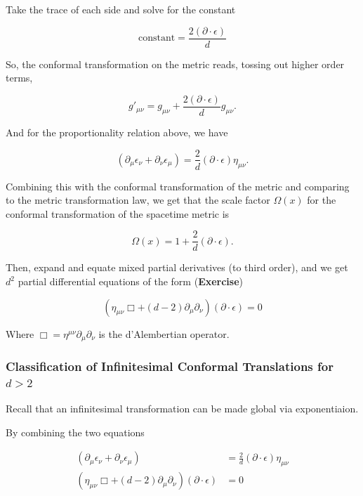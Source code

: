 \noindent Take the trace of each side and solve for the constant

\begin{equation}
\text{constant} = \frac{2 (\partial \cdot \epsilon)}{d}
\end{equation}

\noindent So, the conformal transformation on the metric reads, tossing out higher order terms,

\begin{equation}
g'_{\mu\nu} = g_{\mu\nu} + \frac{2 (\partial \cdot \epsilon)}{d} g_{\mu\nu}.
\end{equation}

\noindent And for the proportionality relation above, we have

\begin{equation}
(\partial_\mu \epsilon_\nu + \partial_\nu \epsilon_\mu) = \frac{2}{d} (\partial \cdot \epsilon) \eta_{\mu\nu}.
\end{equation}

\noindent Combining this with the conformal transformation of the metric and comparing to the metric transformation law, we get that the scale factor $\Omega(x)$ for the conformal transformation of the spacetime metric is 

\begin{equation}
\Omega(x) = 1+\frac{2}{d} (\partial \cdot \epsilon).
\end{equation}

\noindent Then, expand and equate mixed partial derivatives (to third order), and we get $d^2$ partial differential equations of the form (\textbf{Exercise})

\begin{equation}
(\eta_{\mu\nu} \Box + (d-2) \partial_\mu \partial_\nu) (\partial \cdot \epsilon) = 0
\end{equation}

\noindent Where $\Box = \eta^{\mu\nu} \partial_\mu \partial_\nu$ is the d'Alembertian operator.

\subsubsection*{Classification of Infinitesimal Conformal Translations for $d>2$}

\noindent Recall that an infinitesimal transformation can be made global via exponentiaion.

\noindent By combining the two equations

\begin{align}
(\partial_\mu \epsilon_\nu + \partial_\nu \epsilon_\mu) &= \frac{2}{d} (\partial \cdot \epsilon) \eta_{\mu\nu} \\
(\eta_{\mu\nu} \Box + (d-2) \partial_\mu \partial_\nu) (\partial \cdot \epsilon) &= 0
\end{align}

